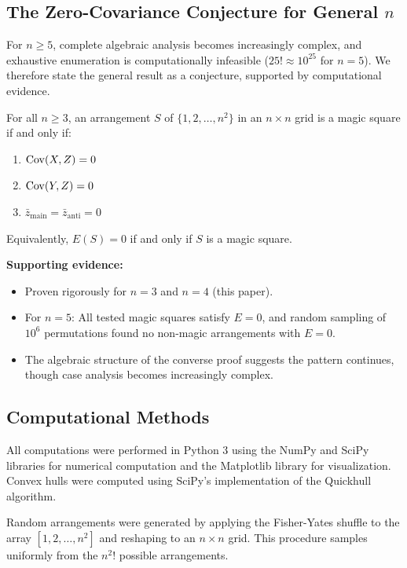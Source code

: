 \subsection{The Zero-Covariance Conjecture for General $n$}

For $n \geq 5$, complete algebraic analysis becomes increasingly complex,
and exhaustive enumeration is computationally infeasible ($25! \approx 10^{25}$ for $n = 5$).
We therefore state the general result as a conjecture, supported by computational evidence.

\begin{conjecture}
\label{conj:general}
For all $n \geq 3$, an arrangement $S$ of $\{1, 2, \ldots, n^2\}$ in an $n \times n$ grid 
is a magic square if and only if:
\begin{enumerate}
\item $\mathrm{Cov}(X, Z) = 0$
\item $\mathrm{Cov}(Y, Z) = 0$
\item $\bar{z}_{\mathrm{main}} = \bar{z}_{\mathrm{anti}} = 0$
\end{enumerate}
Equivalently, $E(S) = 0$ if and only if $S$ is a magic square.
\end{conjecture}

\textbf{Supporting evidence:}
\begin{itemize}
\item Proven rigorously for $n = 3$ and $n = 4$ (this paper).
\item For $n = 5$: All tested magic squares satisfy $E = 0$, 
and random sampling of $10^6$ permutations found no non-magic arrangements with $E = 0$.
\item The algebraic structure of the converse proof 
suggests the pattern continues, though case analysis becomes increasingly complex.
\end{itemize}

\subsection{Computational Methods}

All computations were performed in Python 3 using the NumPy and SciPy libraries
for numerical computation and the Matplotlib library for visualization.
Convex hulls were computed using SciPy's implementation of the Quickhull algorithm.

Random arrangements were generated by applying the Fisher-Yates shuffle
to the array $[1, 2, \ldots, n^2]$ and reshaping to an $n \times n$ grid.
This procedure samples uniformly from the $n^2!$ possible arrangements.

